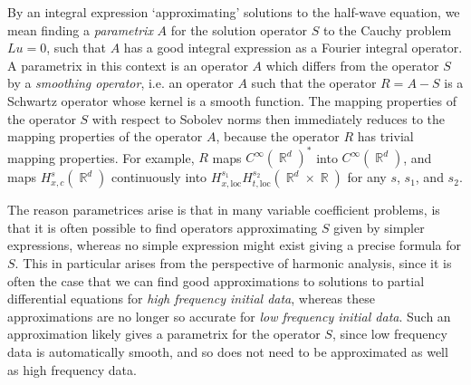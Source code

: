 \documentclass{article}
\theoremstyle{plain}
\theoremstyle{remark}
\theoremstyle{definition}
\DeclareMathOperator{\RR}{\mathbb{R}}
\begin{document}
By an integral expression `approximating' solutions to the half-wave equation, we mean finding a \emph{parametrix} $A$ for the solution operator $S$ to the Cauchy problem $Lu = 0$, such that $A$ has a good integral expression as a Fourier integral operator. A parametrix in this context is an operator $A$ which differs from the operator $S$ by a \emph{smoothing operator}, i.e. an operator $A$ such that the operator $R = A - S$ is a Schwartz operator whose kernel is a smooth function. The mapping properties of the operator $S$ with respect to Sobolev norms then immediately reduces to the mapping properties of the operator $A$, because the operator $R$ has trivial mapping properties. For example, $R$ maps $C^\infty(\RR^d)^*$ into $C^\infty(\RR^d)$, and maps $H^s_{x,c}(\RR^d)$ continuously into $H^{s_1}_{x,\text{loc}} H^{s_2}_{t,\text{loc}}(\RR^d \times \RR)$ for any $s$, $s_1$, and $s_2$.

The reason parametrices arise is that in many variable coefficient problems, is that it is often possible to find operators approximating $S$ given by simpler expressions, whereas no simple expression might exist giving a precise formula for $S$. This in particular arises from the perspective of harmonic analysis, since it is often the case that we can find good approximations to solutions to partial differential equations for \emph{high frequency initial data}, whereas these approximations are no longer so accurate for \emph{low frequency initial data}. Such an approximation likely gives a parametrix for the operator $S$, since low frequency data is automatically smooth, and so does not need to be approximated as well as high frequency data.

\end{document}
